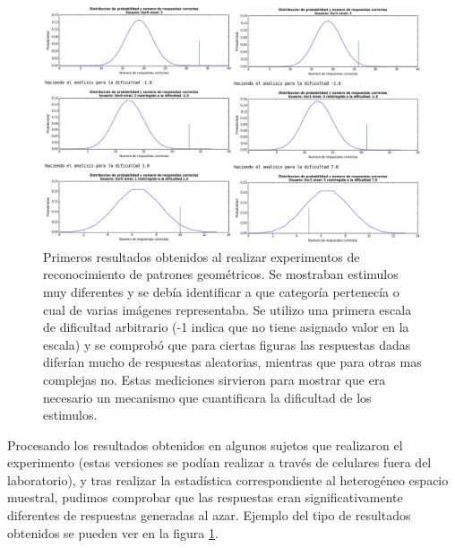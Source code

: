 \documentclass{article}
\begin{document}
    
    \begin{figure}
        \center
        \includegraphics[width=\textwidth]{Imagenes/ResultadosIniciales1.png}
        \caption{Primeros resultados obtenidos al realizar experimentos de reconocimiento de patrones geométricos. Se mostraban estimulos muy diferentes y se debía identificar a que categoría pertenecía o cual de varias imágenes representaba. Se utilizo una primera escala de dificultad arbitrario (-1 indica que no tiene asignado valor en la escala) y se comprobó que para ciertas figuras las respuestas dadas diferían mucho de respuestas aleatorias, mientras que para otras mas complejas no. Estas mediciones sirvieron para mostrar que era necesario un mecanismo que cuantificara la dificultad de los estimulos.}
        \label{fig:ResultadosPreliminar}
    \end{figure}  
    
    Procesando los resultados obtenidos en algunos sujetos que realizaron el experimento (estas versiones se podían realizar a través de celulares fuera del laboratorio), y tras realizar la estadística correspondiente al heterogéneo espacio muestral, pudimos comprobar que las respuestas eran significativamente diferentes de respuestas generadas al azar. Ejemplo del tipo de resultados obtenidos se pueden ver en la figura \ref{fig:ResultadosPreliminar}. 
    
    
    

\clearpage
\end{document}
